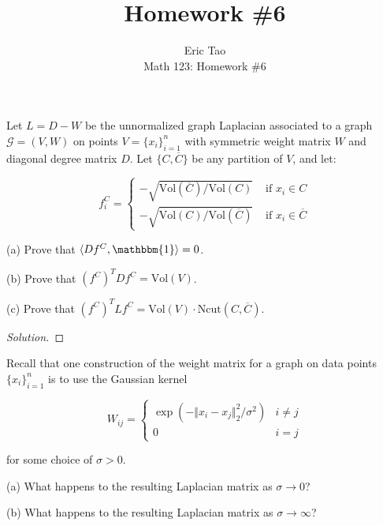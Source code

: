 \documentclass[10pt]{article}
\newcommand{\vol}{{\text{Vol}}}
\newenvironment{problem}[2][]{\begin{trivlist}
\item[\hskip \labelsep {\bfseries #1}\hskip \labelsep {\bfseries #2.}]}{\end{trivlist}}
\begin{document}
 
\title{Homework \#6}
\author{Eric Tao\\
Math 123: Homework \#6}
\maketitle

\begin{problem}{Question 1}

Let $L = D - W$ be the unnormalized graph Laplacian associated to a graph $\mathcal{G} = (V,W)$ on points $V = \{ x_i \}_{i=1}^n$ with symmetric weight matrix $W$ and diagonal degree matrix $D$. Let $\{ C, \overline{C} \}$ be any partition of $V$, and let:

$$ f^C_i = \begin{cases} -\sqrt{\vol(\overline{C})/\vol(C)} & \text{ if } x_i \in C \\ -\sqrt{\vol(C)/\vol(\overline{C})} & \text{ if } x_i \in \overline{C} \end{cases} $$

(a) Prove that $\langle Df^C, \mathbbm{1} \rangle = 0$.

(b) Prove that $(f^C)^T D f^C = \vol(V)$.

(c) Prove that $(f^C)^T L f^C = \vol(V) \cdot \text{Ncut}(C, \overline{C})$.

\end{problem}

\begin{proof}[Solution]

\end{proof}

\begin{problem}{Question 2}

Recall that one construction of the weight matrix for a graph on data points $\{ x_i \}_{i=1}^n$ is to use the Gaussian kernel 

$$W_{ij} = \begin{cases} \exp(-\Vert x_i - x_j \Vert_2^2/\sigma^2) &  i \not = j \\ 0 & i = j \end{cases}$$

for some choice of $\sigma > 0$.

(a) What happens to the resulting Laplacian matrix as $\sigma \to 0$?

(b) What happens to the resulting Laplacian matrix as $\sigma \to \infty$?

\end{problem}
\end{document}
